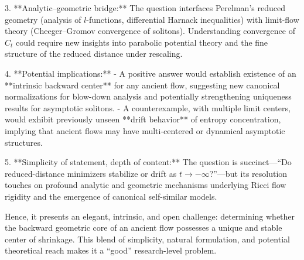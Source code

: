 3. **Analytic–geometric bridge:**  
   The question interfaces Perelman’s reduced geometry (analysis of \(l\)-functions, differential Harnack inequalities) with limit-flow theory (Cheeger–Gromov convergence of solitons). Understanding convergence of \(C_t\) could require new insights into parabolic potential theory and the fine structure of the reduced distance under rescaling.

4. **Potential implications:**  
   - A positive answer would establish existence of an **intrinsic backward center** for any ancient flow, suggesting new canonical normalizations for blow-down analysis and potentially strengthening uniqueness results for asymptotic solitons.  
   - A counterexample, with multiple limit centers, would exhibit previously unseen **drift behavior** of entropy concentration, implying that ancient flows may have multi-centered or dynamical asymptotic structures.

5. **Simplicity of statement, depth of content:**  
   The question is succinct—“Do reduced-distance minimizers stabilize or drift as \(t\to -\infty\)?”—but its resolution touches on profound analytic and geometric mechanisms underlying Ricci flow rigidity and the emergence of canonical self-similar models.

Hence, it presents an elegant, intrinsic, and open challenge: determining whether the backward geometric core of an ancient flow possesses a unique and stable center of shrinkage. This blend of simplicity, natural formulation, and potential theoretical reach makes it a “good” research-level problem.